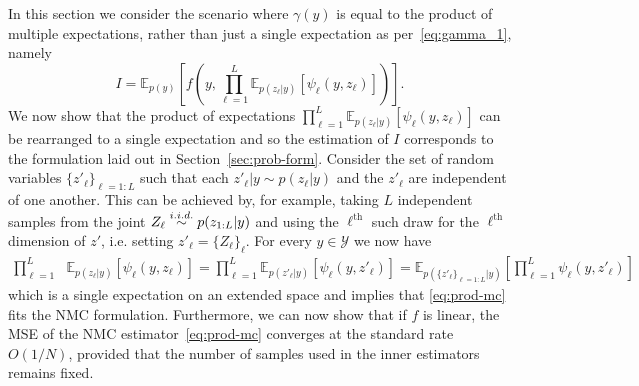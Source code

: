 In this section we consider the scenario  where $\gamma (y)$ is equal to the product of 
multiple expectations, rather than just a single expectation as per~\eqref{eq:gamma_1}, namely
\begin{equation}
\label{eq:prod-mc}
I = \mathbb{E}_{p(y)}\left[ f\left(y,\prod_{\ell=1}^{L}\mathbb{E}_{p(z_{\ell}|y)}\left[\psi_{\ell}(y,z_{\ell})\right]\right) \right].
\end{equation}
We now show that the product of expectations $\prod_{\ell=1}^{L}\mathbb{E}_{p(z_{\ell}|y)}\left[\psi_{\ell}(y,z_{\ell})\right]$ 
can be rearranged to a single expectation and so the estimation of $I$ 
corresponds to the formulation laid out in Section~\ref{sec:prob-form}. Consider the set of 
random variables $\{z'_{\ell}\}_{\ell=1:L}$ such that each 
$z'_{\ell}|y \sim p(z_\ell | y)$ and the $z'_{\ell}$ are independent of one another. 
This can be achieved by, for example, taking $L$ independent samples from the joint $Z_{\ell} \overset{i.i.d.}{\sim} p(z_{1:L} | y)$ 
and using the $\ell^{\mathrm{th}}$ such draw for the $\ell^{\mathrm{th}}$ dimension of $z'$, i.e.
setting $z'_{\ell}= \{Z_{\ell}\}_{\ell}$.
For every $y \in \mathcal{Y}$ we now have
\begin{align*}
 \prod_{\ell=1}^{L}&\mathbb{E}_{p(z_{\ell}|y)}[\psi_{\ell}(y,z_{\ell})] =  \prod_{\ell=1}^{L}\mathbb{E}_{p(z'_{\ell}|y)}[\psi_{\ell}(y,z'_{\ell})]
  = \mathbb{E}_{p(\{z'_{\ell}\}_{\ell=1:L}|y)}\left[ \prod_{\ell=1}^{L} \psi_{\ell}(y,z'_{\ell}) \right]
\end{align*}
which is a single expectation on an extended space and implies that \eqref{eq:prod-mc} 
fits the NMC formulation.
Furthermore, we can now show that if $f$ is linear, the MSE of the NMC estimator~\eqref{eq:prod-mc}
converges at the standard \mc rate $O(1/N)$, provided that 
the number of samples used in the inner estimators remains fixed.  

